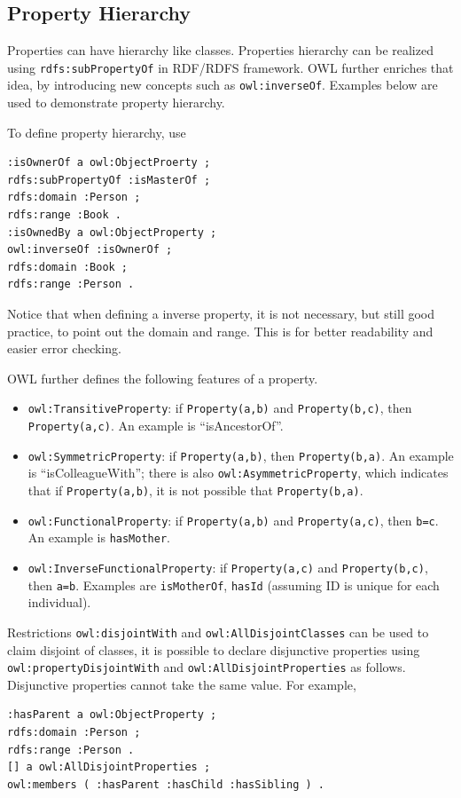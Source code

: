 \subsection{Property Hierarchy}

Properties can have hierarchy like classes. Properties hierarchy can be realized using \verb|rdfs:subPropertyOf| in RDF/RDFS framework. OWL further enriches that idea, by introducing new concepts such as \verb|owl:inverseOf|. Examples below are used to demonstrate property hierarchy.

To define property hierarchy, use
\begin{lstlisting}
:isOwnerOf a owl:ObjectProerty ;
rdfs:subPropertyOf :isMasterOf ;
rdfs:domain :Person ;
rdfs:range :Book .
:isOwnedBy a owl:ObjectProperty ;
owl:inverseOf :isOwnerOf ;
rdfs:domain :Book ;
rdfs:range :Person .
\end{lstlisting}
Notice that when defining a inverse property, it is not necessary, but still good practice, to point out the domain and range. This is for better readability and easier error checking.

OWL further defines the following features of a property.
\begin{itemize}
	\item \verb|owl:TransitiveProperty|: if \verb|Property(a,b)| and \verb|Property(b,c)|, then \verb|Property(a,c)|. An example is ``isAncestorOf''.
	\item \verb|owl:SymmetricProperty|: if \verb|Property(a,b)|, then \verb|Property(b,a)|. An example is ``isColleagueWith''; there is also \verb|owl:AsymmetricProperty|, which indicates that if \verb|Property(a,b)|, it is not possible that \verb|Property(b,a)|.
	\item \verb|owl:FunctionalProperty|: if \verb|Property(a,b)| and \verb|Property(a,c)|, then \verb|b=c|. An example is \verb|hasMother|.
	\item \verb|owl:InverseFunctionalProperty|: if \verb|Property(a,c)| and \verb|Property(b,c)|, then \verb|a=b|. Examples are \verb|isMotherOf|, \verb|hasId| (assuming ID is unique for each individual).
\end{itemize}

Restrictions \verb|owl:disjointWith| and \verb|owl:AllDisjointClasses| can be used to claim disjoint of classes, it is possible to declare disjunctive properties using \verb|owl:propertyDisjointWith| and \verb|owl:AllDisjointProperties| as follows. Disjunctive properties cannot take the same value. For example,
\begin{lstlisting}
:hasParent a owl:ObjectProperty ;
rdfs:domain :Person ;
rdfs:range :Person .
[] a owl:AllDisjointProperties ;
owl:members ( :hasParent :hasChild :hasSibling ) .
\end{lstlisting}

